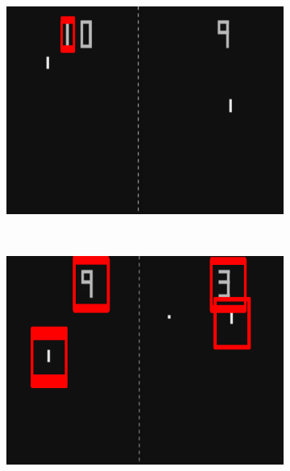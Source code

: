 \documentclass{report}
\begin{document}
\begin{figure}
    \begin{subfigure}{\linewidth}
        \centering
        \includegraphics[height=0.3\textheight]{tempLow.png}
    \end{subfigure}
    \\[2em]
    \begin{subfigure}{\linewidth}
        \centering
        \includegraphics[height=0.3\textheight]{tempMed.png}
    \end{subfigure}
    \\[2em]
    \begin{subfigure}{\linewidth}
        \centering

\end{subfigure}
\end{figure}
\end{document}
